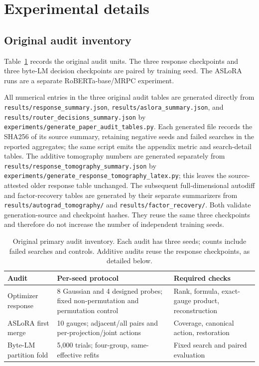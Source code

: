 \section{Experimental details}
\label{app:experimental-details}

\subsection{Original audit inventory}

Table~\ref{tab:primary-audit-inventory} records the original audit units.  The three response checkpoints and three byte-LM decision checkpoints
are paired by training seed.  The ASLoRA runs are a separate RoBERTa-base/MRPC
experiment.

All numerical entries in the three original audit tables are generated directly from
\texttt{results/response\_summary.json},
\texttt{results/aslora\_summary.json}, and
\texttt{results/router\_decisions\_summary.json} by
\texttt{experiments/generate\_paper\_audit\_tables.py}.  Each generated file
records the SHA256 of its source summary, retaining negative seeds and failed
searches in the reported aggregates; the same script emits the appendix metric
and search-detail tables.  The additive tomography numbers are
generated separately from
\texttt{results/response\_tomography\_summary.json} by
\texttt{experiments/generate\_response\_tomography\_latex.py}; this leaves the
source-attested older response table unchanged.
The subsequent full-dimensional autodiff and factor-recovery tables are
generated by their separate summarizers from
\texttt{results/autograd\_tomography/} and
\texttt{results/factor\_recovery/}. Both validate generation-source and
checkpoint hashes. They reuse the same three checkpoints and therefore do
not increase the number of independent training seeds.

\begin{table}[H]
\centering
\small
\caption{Original primary audit inventory. Each audit has three seeds;
counts include failed searches and controls. Additive audits reuse the
response checkpoints, as detailed below.}
\label{tab:primary-audit-inventory}
\begin{tabular}{@{}p{.20\linewidth}p{.39\linewidth}p{.32\linewidth}@{}}
\toprule
Audit & Per-seed protocol & Required checks \\
\midrule
Optimizer response & 8 Gaussian and 4 designed probes; fixed non-permutation and permutation control & Rank, formula, exact-gauge product, reconstruction \\
ASLoRA first merge & 10 gauges; adjacent/all pairs and per-projection/joint actions & Coverage, canonical action, restoration \\
Byte-LM partition fold & 5,000 trials; four-group, same-effective refits & Fixed search and paired evaluation \\
\bottomrule
\end{tabular}
\end{table}

